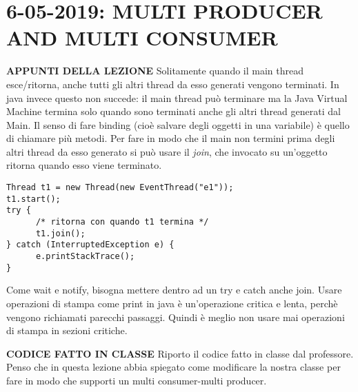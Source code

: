 

\newpage
\section{6-05-2019: MULTI PRODUCER AND MULTI CONSUMER}
\noindent \textbf{APPUNTI DELLA LEZIONE} \newline
Solitamente quando il main thread esce/ritorna, anche tutti gli altri thread da esso generati vengono terminati. In java invece questo non succede: il main thread può terminare ma la Java Virtual Machine termina solo quando sono terminati anche gli altri thread generati dal Main.\newline
Il senso di fare binding (cioè salvare degli oggetti in una variabile) è quello di chiamare più metodi. \newline
Per fare in modo che il main non termini prima degli altri thread da esso generato si può usare il \textit{join}, che invocato su un'oggetto ritorna quando esso viene terminato.
\begin{lstlisting}
Thread t1 = new Thread(new EventThread("e1"));
t1.start();
try {
	  /* ritorna con quando t1 termina */
      t1.join();
} catch (InterruptedException e) {
      e.printStackTrace();
}
\end{lstlisting}
\noindent Come wait e notify, bisogna mettere dentro ad un try e catch anche join. \newline
Usare operazioni di stampa come print in java è un'operazione critica e lenta, perchè vengono richiamati parecchi passaggi. Quindi è meglio non usare mai operazioni di stampa in sezioni critiche.


\noindent \textbf{CODICE FATTO IN CLASSE} \newline
Riporto il codice fatto in classe dal professore. \newline
Penso che in questa lezione abbia spiegato come modificare la nostra classe per fare in modo che supporti un multi consumer-multi producer.

